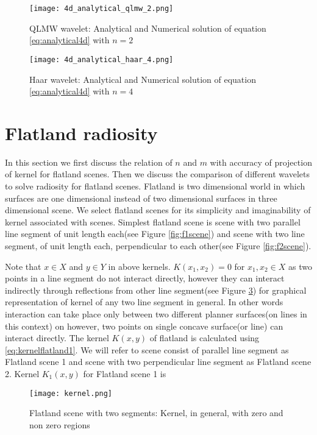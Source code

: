 \begin{figure}[h!]
\centering{}
\captionsetup{justification=centering}
\texttt{[image: 4d\_analytical\_qlmw\_2.png]}
\caption{\label{fig:4d_analytical_qlmw_2}QLMW wavelet: Analytical and Numerical solution of equation \ref{eq:analytical4d} with $n=2$}
\end{figure}

\begin{figure}[h!]
\centering{}
\captionsetup{justification=centering}
\texttt{[image: 4d\_analytical\_haar\_4.png]}
\caption{\label{fig:4d_analytical_haar_4}Haar wavelet: Analytical and Numerical solution of equation \ref{eq:analytical4d} with $n=4$}
\end{figure}


\section{Flatland radiosity}
In this section we first discuss the relation of $n$ and $m$ with accuracy of projection of kernel for flatland scenes.  Then we discuss the comparison of different wavelets to solve radiosity for flatland scenes. Flatland is two dimensional world in which surfaces are one dimensional instead of two dimensional surfaces in three dimensional scene. We select flatland scenes for its simplicity and imaginability of kernel associated with scenes. Simplest flatland scene is scene with two parallel line segment of unit length each(see Figure \ref{fig:f1scene}) and scene with two line segment, of unit length each, perpendicular to each other(see Figure \ref{fig:f2scene}). 



Note that $x \in X$ and $y \in Y$ in above kernels. $K(x_1,x_2) = 0$ for $x_1,x_2 \in X$ as two points in a line segment do not interact directly, however they can interact indirectly through reflections from other line segment(see Figure \ref{fig:kernel}) for graphical representation of kernel of any two line segment in general. In other words interaction can take place only between two different planner surfaces(on lines in this context) on however, two points on single concave surface(or line) can interact directly.  The kernel $K(x,y)$ of flatland is calculated using \ref{eq:kernelflatland1}. We will refer to scene consist of parallel line segment as Flatland scene 1 and scene with two perpendicular line segment as Flatland scene 2. Kernel $K_1(x,y)$ for Flatland scene 1 is


\begin{figure}[tbh]
\centering{}
\captionsetup{justification=centering}
\texttt{[image: kernel.png]}
\caption{\label{fig:kernel}Flatland scene with two segments: Kernel, in general, with zero and non zero regions}
\end{figure}



